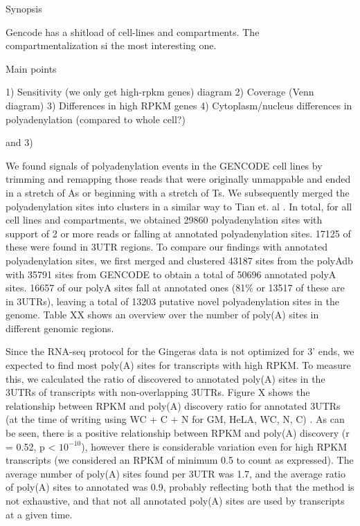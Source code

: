 \documentclass[a4paper]{article}
\begin{document}
 
Synopsis

Gencode has a shitload of cell-lines and compartments. The compartmentalization
si the most interesting one.

Main points

1) Sensitivity (we only get high-rpkm genes) diagram
2) Coverage (Venn diagram)
3) Differences in high RPKM genes
4) Cytoplasm/nucleus differences in polyadenylation (compared to whole cell?)

and 3) %

We found signals of polyadenylation events in the GENCODE cell lines by
trimming and remapping those reads that were originally unmappable and ended in
a stretch of As or beginning with a stretch of Ts. We subsequently merged the
polyadenylation sites into clusters in a similar way to Tian et. al
\cite{tian_large-scale_2005}. In total, for all cell lines and compartments, we
obtained 29860 polyadenylation sites with support of 2 or more reads or falling
at annotated polyadenylation sites.  17125 of these were found in 3UTR regions.
To compare our findings with annotated polyadenylation sites, we first merged
and clustered 43187 sites from the polyAdb with 35791 sites from GENCODE to
obtain a total of 50696 annotated polyA sites. 16657 of our polyA sites fall at
annotated ones (81\% or 13517 of these are in 3UTRs), leaving a total of 13203
putative novel polyadenylation sites in the genome. Table XX shows an overview
over the number of poly(A) sites in different genomic regions.

Since the RNA-seq protocol for the Gingeras data is not optimized for 3' ends,
we expected to find most poly(A) sites for transcripts with high RPKM. To
measure this, we calculated the ratio of discovered to annotated poly(A) sites
in the 3UTRs of transcripts with non-overlapping 3UTRs. Figure X shows the
relationship between RPKM and poly(A) discovery ratio for annotated 3UTRs (at
the time of writing using WC + C + N for GM, HeLA, WC, N, C) . As can be seen,
there is a positive relationship between RPKM and poly(A) discovery (r = 0.52,
p < $10^{-10}$), however there is considerable variation even for high RPKM
transcripts (we considered an RPKM of minimum 0.5 to count as expressed). The
average number of poly(A) sites found per 3UTR was 1.7, and the average ratio
of poly(A) sites to annotated was 0.9, probably reflecting both that the method
is not exhaustive, and that not all annotated poly(A) sites are used by
transcripts at a given time.
\end{document}
